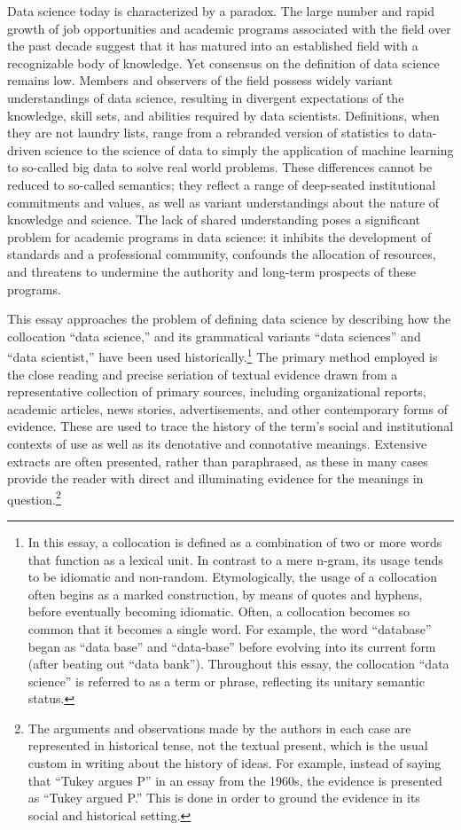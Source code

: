 \documentclass[
  letterpaper,
]{report}
\begin{document}
Data science today is characterized by a paradox. The large number and
rapid growth of job opportunities and academic programs associated with
the field over the past decade suggest that it has matured into an
established field with a recognizable body of knowledge. Yet consensus
on the definition of data science remains low. Members and observers of
the field possess widely variant understandings of data science,
resulting in divergent expectations of the knowledge, skill sets, and
abilities required by data scientists. Definitions, when they are not
laundry lists, range from a rebranded version of statistics to
data-driven science to the science of data to simply the application of
machine learning to so-called big data to solve real world problems.
These differences cannot be reduced to so-called semantics; they reflect
a range of deep-seated institutional commitments and values, as well as
variant understandings about the nature of knowledge and science. The
lack of shared understanding poses a significant problem for academic
programs in data science: it inhibits the development of standards and a
professional community, confounds the allocation of resources, and
threatens to undermine the authority and long-term prospects of these
programs.

This essay approaches the problem of defining data science by describing
how the collocation ``data science,'' and its grammatical variants
``data sciences'' and ``data scientist,'' have been used
historically.\footnote{In this essay, a collocation is defined as a
  combination of two or more words that function as a lexical unit. In
  contrast to a mere n-gram, its usage tends to be idiomatic and
  non-random. Etymologically, the usage of a collocation often begins as
  a marked construction, by means of quotes and hyphens, before
  eventually becoming idiomatic. Often, a collocation becomes so common
  that it becomes a single word. For example, the word ``database''
  began as ``data base'' and ``data-base'' before evolving into its
  current form (after beating out ``data bank''). Throughout this essay,
  the collocation ``data science'' is referred to as a term or phrase,
  reflecting its unitary semantic status.} The primary method employed
is the close reading and precise seriation of textual evidence drawn
from a representative collection of primary sources, including
organizational reports, academic articles, news stories, advertisements,
and other contemporary forms of evidence. These are used to trace the
history of the term's social and institutional contexts of use as well
as its denotative and connotative meanings. Extensive extracts are often
presented, rather than paraphrased, as these in many cases provide the
reader with direct and illuminating evidence for the meanings in
question.\footnote{The arguments and observations made by the authors in
  each case are represented in historical tense, not the textual
  present, which is the usual custom in writing about the history of
  ideas. For example, instead of saying that ``Tukey argues P'' in an
  essay from the 1960s, the evidence is presented as ``Tukey argued P.''
  This is done in order to ground the evidence in its social and
  historical setting.}
\end{document}
